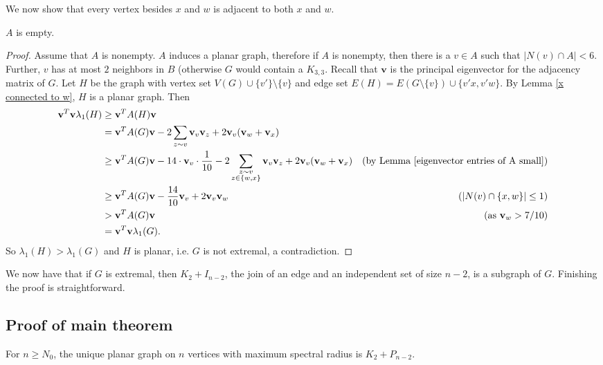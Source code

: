 We now show that every vertex besides $x$ and $w$ is adjacent to both $x$ and $w$.

\begin{lemma}\label{A empty}
$A$ is empty.
\end{lemma}

\begin{proof}
Assume that $A$ is nonempty. $A$ induces a planar graph, therefore if $A$ is nonempty, then there is a $v\in A$ such that $|N(v)\cap A| < 6$. Further, $v$ has at most $2$ neighbors in $B$ (otherwise $G$ would contain a $K_{3,3}$. Recall that $\textbf{v}$ is the principal eigenvector for the adjacency matrix of $G$. Let $H$ be the graph with vertex set $V(G) \cup \{v'\} \setminus \{v\}$ and edge set $E(H) = E(G\setminus\{v\}) \cup \{v'x, v'w\}$. By Lemma \ref{x connected to w}, $H$ is a planar graph. Then 
\begin{align*}
\textbf{v}^T \textbf{v}\lambda_1(H) &\geq \textbf{v}^T A(H) \textbf{v} & \\
& = \textbf{v}^T A(G) \textbf{v} - 2\sum_{z\sim v} \mathbf{v}_v\mathbf{v}_z + 2\mathbf{v}_v(\mathbf{v}_w+\mathbf{v}_x) & \\
& \geq \textbf{v}^T A(G) \textbf{v} - 14\cdot \mathbf{v}_v \cdot \frac{1}{10} - 2\sum_{\substack{z\sim v\\ z\in \{w,x\}}} \mathbf{v}_v\mathbf{v}_z + 2\mathbf{v}_v(\mathbf{v}_w+\mathbf{v}_x) & \mbox{(by Lemma \ref{eigenvector entries of A small})} \\
& \geq \textbf{v}^T A(G) \textbf{v} - \frac{14}{10}\mathbf{v}_v + 2\mathbf{v}_v\mathbf{v}_w & \mbox{($|N(v)\cap \{x,w\}| \leq 1$)} \\
& > \textbf{v}^T A(G) \textbf{v} & \mbox{(as $\mathbf{v}_w>7/10$)}\\
&= \textbf{v}^T\textbf{v} \lambda_1(G).
\end{align*}
So $\lambda_1(H) > \lambda_1(G)$ and $H$ is planar, i.e. $G$ is not extremal, a contradiction.
\end{proof}


We now have that if $G$ is extremal, then $K_2+I_{n-2}$, the join of an edge and an independent set of size $n-2$, is a subgraph of $G$. Finishing the proof is straightforward.


\subsection{Proof of main theorem}

\begin{theorem}
For $n\geq N_0$, the unique planar graph on $n$ vertices with maximum spectral radius is $K_{2} + P_{n-2}$.
\end{theorem}

